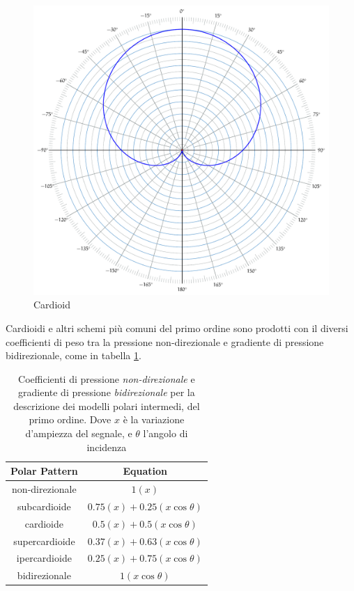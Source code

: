 \begin{figure}[t]
\centering
\includegraphics[width=1\columnwidth]{CAPITOLI/_TIKZ/POLAR/cardioid}
\caption{Cardioid}
\label{polar:cardioid}
\end{figure}

Cardioidi e altri schemi più comuni del primo ordine sono prodotti con il
diversi coefficienti di peso tra la pressione non-direzionale e gradiente di pressione
bidirezionale, come in tabella \ref{tab:polarcoef}.

\begin{table}[ht]
\begin{center}
\begin{tabular}{cc}
\textbf{Polar Pattern} & \textbf{Equation} \\
\hline
non-direzionale & $1(x)$ \\
subcardioide    & $0.75(x)+0.25(x\cos\theta)$ \\
cardioide       & $0.5(x)+0.5(x\cos\theta)$ \\
supercardioide  & $0.37(x)+0.63(x\cos\theta)$ \\
ipercardioide   & $0.25(x)+0.75(x\cos\theta)$ \\
bidirezionale   & $1(x\cos\theta)$ \\
\end{tabular}
\end{center}
\caption{Coefficienti di pressione \emph{non-direzionale} e gradiente di pressione
\emph{bidirezionale} per la descrizione dei modelli polari intermedi, del primo ordine.
Dove $x$ è la variazione d'ampiezza del segnale, e $\theta$ l'angolo di incidenza}
\label{tab:polarcoef}
\end{table}

